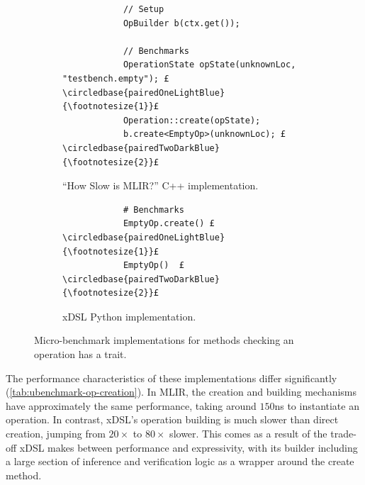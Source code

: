\begin{figure}[H]
    \centering
    \begin{subfigure}[b]{0.45\textwidth}
       \centering
        \begin{verbatim}
            // Setup
            OpBuilder b(ctx.get());

            // Benchmarks
            OperationState opState(unknownLoc, "testbench.empty"); £\circledbase{pairedOneLightBlue}{\footnotesize{1}}£
            Operation::create(opState);
            b.create<EmptyOp>(unknownLoc); £\circledbase{pairedTwoDarkBlue}{\footnotesize{2}}£
        \end{verbatim}
        \caption{``How Slow is MLIR?'' C++ implementation.}
        \label{listing:ubenchmark-op-creation-bench-mlir}
    \end{subfigure}
    \hfill
    \begin{subfigure}[b]{0.45\textwidth}
        \centering
        \begin{verbatim}
            # Benchmarks
            EmptyOp.create() £\circledbase{pairedOneLightBlue}{\footnotesize{1}}£
            EmptyOp()  £\circledbase{pairedTwoDarkBlue}{\footnotesize{2}}£
        \end{verbatim}
        \footnotesize\vspace{3.5em}
        \caption{xDSL Python implementation.}
        \label{listing:ubenchmark-op-creation-bench-xdsl}
    \end{subfigure}
    \vspace{1em}
    \captionsetup{name=Listing}
    \caption{Micro-benchmark implementations for methods checking an operation has a trait.}
    \label{listing:ubenchmark-op-creation-bench}
\end{figure}

The performance characteristics of these implementations differ significantly (\autoref{tab:ubenchmark-op-creation}).
In MLIR, the creation and building mechanisms have approximately the same performance, taking around $150$ns to instantiate an operation. In contrast, xDSL's operation building is much slower than direct creation, jumping from $20\times$ to $80\times$ slower. This comes as a result of the trade-off xDSL makes between performance and expressivity, with its builder including a large section of inference and verification logic as a wrapper around the create method.


